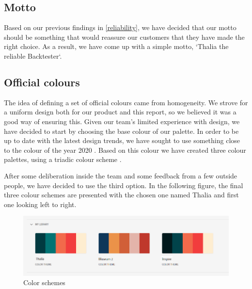 \documentclass[main.tex]{subfiles}
\begin{document}
\subsection{Motto}

Based on our previous findings in \ref{reliability}, we have decided that our motto should be something that would reassure our customers that they have made the right choice. As a result, we have come up with a simple motto, `Thalia the reliable Backtester`.


\subsection{Official colours} 

The idea of defining a set of official colours came from homogeneity. We strove for a uniform design both for our product and this report, so we believed it was a good way of ensuring this. Given our team's limited experience with design, we have decided to start by choosing the base colour of our palette. In order to be up to date with the latest design trends, we have sought to use something close to the colour of the year 2020 \cite{pantone}. Based on this colour we have created three colour palettes, using a triadic colour scheme \cite{triadic}.

After some deliberation inside the team and some feedback from a few outside people, we have decided to use the third option. In the following figure, the final three colour schemes are presented with the chosen one named Thalia and first one looking left to right.

\begin{figure}[H]
    \includegraphics[width=\textwidth]{03Branding/Pictures/color_schemes.png}
    \caption{Color schemes}
\end{figure}
\end{document}
